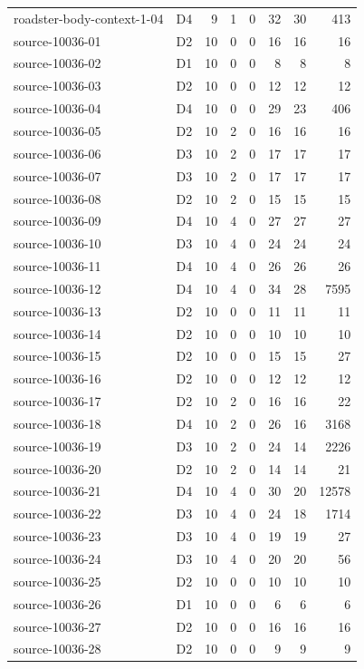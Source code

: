 \begin{longtable}{llrrrrrr}
roadster-body-context-1-04 & D4 & 9 & 1 & 0 & 32 & 30 & 413\\
source-10036-01 & D2 & 10 & 0 & 0 & 16 & 16 & 16\\
source-10036-02 & D1 & 10 & 0 & 0 & 8 & 8 & 8\\
source-10036-03 & D2 & 10 & 0 & 0 & 12 & 12 & 12\\
source-10036-04 & D4 & 10 & 0 & 0 & 29 & 23 & 406\\
source-10036-05 & D2 & 10 & 2 & 0 & 16 & 16 & 16\\
source-10036-06 & D3 & 10 & 2 & 0 & 17 & 17 & 17\\
source-10036-07 & D3 & 10 & 2 & 0 & 17 & 17 & 17\\
source-10036-08 & D2 & 10 & 2 & 0 & 15 & 15 & 15\\
source-10036-09 & D4 & 10 & 4 & 0 & 27 & 27 & 27\\
source-10036-10 & D3 & 10 & 4 & 0 & 24 & 24 & 24\\
source-10036-11 & D4 & 10 & 4 & 0 & 26 & 26 & 26\\
source-10036-12 & D4 & 10 & 4 & 0 & 34 & 28 & 7595\\
source-10036-13 & D2 & 10 & 0 & 0 & 11 & 11 & 11\\
source-10036-14 & D2 & 10 & 0 & 0 & 10 & 10 & 10\\
source-10036-15 & D2 & 10 & 0 & 0 & 15 & 15 & 27\\
source-10036-16 & D2 & 10 & 0 & 0 & 12 & 12 & 12\\
source-10036-17 & D2 & 10 & 2 & 0 & 16 & 16 & 22\\
source-10036-18 & D4 & 10 & 2 & 0 & 26 & 16 & 3168\\
source-10036-19 & D3 & 10 & 2 & 0 & 24 & 14 & 2226\\
source-10036-20 & D2 & 10 & 2 & 0 & 14 & 14 & 21\\
source-10036-21 & D4 & 10 & 4 & 0 & 30 & 20 & 12578\\
source-10036-22 & D3 & 10 & 4 & 0 & 24 & 18 & 1714\\
source-10036-23 & D3 & 10 & 4 & 0 & 19 & 19 & 27\\
source-10036-24 & D3 & 10 & 4 & 0 & 20 & 20 & 56\\
source-10036-25 & D2 & 10 & 0 & 0 & 10 & 10 & 10\\
source-10036-26 & D1 & 10 & 0 & 0 & 6 & 6 & 6\\
source-10036-27 & D2 & 10 & 0 & 0 & 16 & 16 & 16\\
source-10036-28 & D2 & 10 & 0 & 0 & 9 & 9 & 9\\

\end{longtable}
